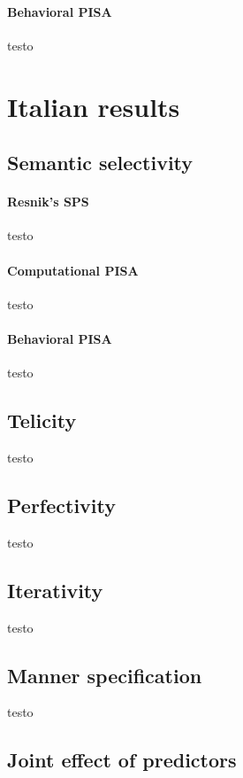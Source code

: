 \paragraph{Behavioral PISA} testo


\section{Italian results} 

\subsection{Semantic selectivity} 

\paragraph{Resnik's SPS} testo

\paragraph{Computational PISA} testo

\paragraph{Behavioral PISA} testo

\subsection{Telicity} 

testo

\subsection{Perfectivity} 

testo

\subsection{Iterativity}

testo

\subsection{Manner specification} 

testo

\subsection{Joint effect of predictors} 



